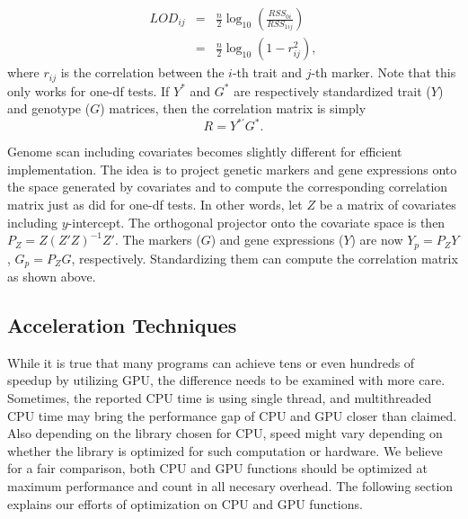 \documentclass[9pt,twocolumn,twoside,lineno]{gsag3jnl}
\begin{document}
\begin{eqnarray*}
	LOD_{ij} &=& \frac{n}{2} \log_{10} \left( \frac{RSS_{0i}}{RSS_{1ij}} \right)\\
	&=& \frac{n}{2} \log_{10} \left( 1{-}r_{ij}^2 \right),
\end{eqnarray*}
where $r_{ij}$ is the correlation between the $i$-th trait and
$j$-th marker. Note that this only works for one-df tests.  If $Y^{\ast}$ and $G^{\ast}$ are respectively standardized 
trait ($Y$) and genotype ($G$) matrices, then the
correlation matrix is simply $$R=Y ^{\ast '}G^{\ast}.$$

Genome scan including covariates becomes slightly different for efficient implementation.  The idea is to project genetic markers 
and gene expressions onto the space generated by covariates and to compute the corresponding correlation matrix just as did for one-df tests.  In other words, 
let $Z$ be a matrix of covariates including $y$-intercept.  The orthogonal projector onto the covariate space is then $P_Z= Z(Z'Z)^{-1}Z'$.  
The markers ($G$) and gene expressions ($Y$) are now $Y_p =P_ZY$, $G_p= P_ZG$, respectively.  Standardizing them can compute the correlation matrix as shown above.



\subsection{Acceleration Techniques}
While it is true that many programs can achieve tens or even hundreds of speedup by utilizing GPU, the difference needs to be examined with more care. 
Sometimes, the reported CPU time is using single thread, and multithreaded CPU time may bring the performance gap of CPU and GPU closer than claimed. 
Also depending on the library chosen for CPU, speed might vary depending on whether the library is optimized for such computation or hardware. 
We believe for a fair comparison, both CPU and GPU functions should be optimized at maximum performance and count in all necesary overhead. 
The following section explains our efforts of optimization on CPU and GPU functions. 
\end{document}
